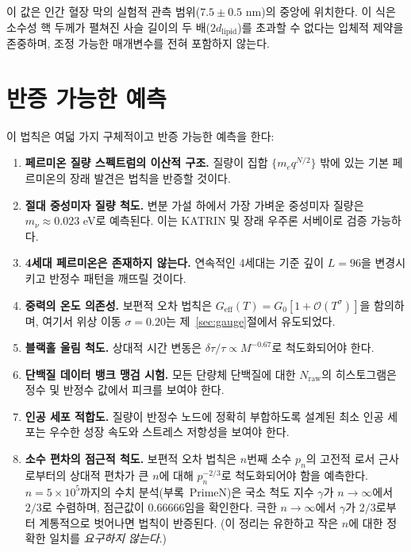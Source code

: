 \documentclass[12pt,a4paper]{article}
\theoremstyle{remark}
\begin{document}
	이 값은 인간 혈장 막의 실험적 관측 범위(\(7.5 \pm 0.5\) nm)의 중앙에 위치한다. 이 식은 소수성 핵 두께가 펼쳐진 사슬 길이의 두 배(\(2 d_{\mathrm{lipid}}\))를 초과할 수 없다는 입체적 제약을 존중하며, 조정 가능한 매개변수를 전혀 포함하지 않는다.
	
	\section{반증 가능한 예측}
	\label{sec:predictions}
	
	이 법칙은 여덟 가지 구체적이고 반증 가능한 예측을 한다:
	
	\begin{enumerate}[label=(\arabic*)]
		\item \textbf{페르미온 질량 스펙트럼의 이산적 구조.} 질량이 집합 \(\{m_e q^{N/2}\}\) 밖에 있는 기본 페르미온의 장래 발견은 법칙을 반증할 것이다.
		\item \textbf{절대 중성미자 질량 척도.} 변분 가설 \cite{AppendixLambda} 하에서 가장 가벼운 중성미자 질량은 \(m_{\nu} \approx 0.023\) eV로 예측된다. 이는 KATRIN 및 장래 우주론 서베이로 검증 가능하다.
		\item \textbf{4세대 페르미온은 존재하지 않는다.} 연속적인 4세대는 기준 깊이 \(L = 96\)을 변경시키고 반정수 패턴을 깨뜨릴 것이다.
		\item \textbf{중력의 온도 의존성.} 보편적 오차 법칙은 \(G_{\mathrm{eff}}(T) = G_0[1 + \mathcal{O}(T^{\sigma})]\)을 함의하며, 여기서 위상 이동 \(\sigma = 0.20\)는 제~\ref{sec:gauge}절에서 유도되었다.
		\item \textbf{블랙홀 울림 척도.} 상대적 시간 변동은 \(\delta\tau/\tau \propto M^{-0.67}\)로 척도화되어야 한다.
		\item \textbf{단백질 데이터 뱅크 맹검 시험.} 모든 단량체 단백질에 대한 \(N_{\mathrm{raw}}\)의 히스토그램은 정수 및 반정수 값에서 피크를 보여야 한다.
		\item \textbf{인공 세포 적합도.} 질량이 반정수 노드에 정확히 부합하도록 설계된 최소 인공 세포는 우수한 성장 속도와 스트레스 저항성을 보여야 한다.
		\item \textbf{소수 편차의 점근적 척도.} 보편적 오차 법칙은 \(n\)번째 소수 \(p_n\)의 고전적 로서 근사로부터의 상대적 편차가 큰 \(n\)에 대해 \(p_n^{-2/3}\)로 척도화되어야 함을 예측한다. \(n = 5\times10^5\)까지의 수치 분석(부록~PrimeN)은 국소 척도 지수 \(\gamma\)가 \(n\to\infty\)에서 \(2/3\)로 수렴하며, 점근값이 \(0.66666\)임을 확인한다. 극한 \(n\to\infty\)에서 \(\gamma\)가 \(2/3\)로부터 계통적으로 벗어나면 법칙이 반증된다. (이 정리는 유한하고 작은 \(n\)에 대한 정확한 일치를 \emph{요구하지 않는다}.)
	\end{enumerate}
	
\end{document}
